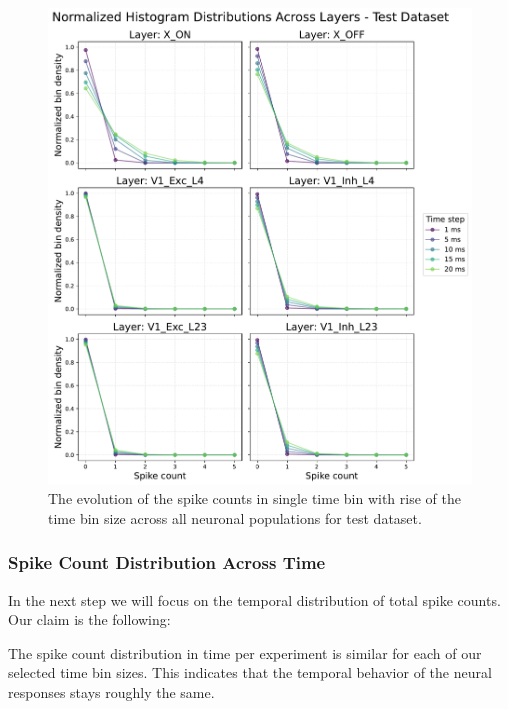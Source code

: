 \begin{figure}
    \centering
    \includegraphics[width=\linewidth]{img/plots/time_step_counts_test.pdf}
    \caption{The evolution of the spike counts in single time bin with rise of the time bin size across all neuronal populations for test dataset.}
    \label{fig:spike_count_distribution_test}
\end{figure}

\subsubsection{Spike Count Distribution Across Time}
\label{subsubsec:spike_time_distribution}
In the next step we will focus on the temporal distribution of total spike counts. Our claim is the following:

\begin{claim}
    The spike count distribution in time per experiment is similar for each of our selected time bin sizes. This indicates that the temporal behavior of the neural responses stays roughly the same.
\end{claim}

